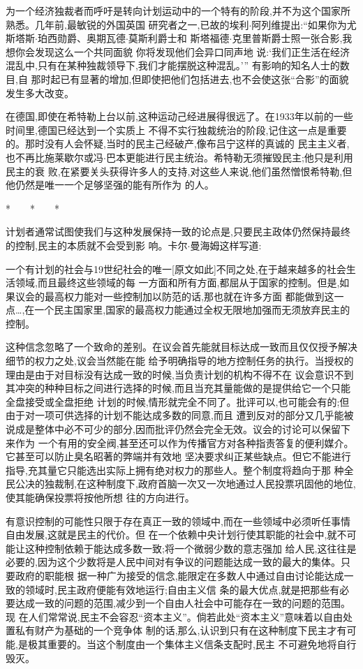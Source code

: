 ﻿\documentclass[12pt]{article}
\begin{document}
为一个经济独裁者而呼吁是转向计划运动中的一个特有的阶段,并不为这个国家所熟悉。几年前,最敏锐的外国英国
研究者之一,已故的埃利$\cdot$阿列维提出:``如果你为尤斯塔斯$\cdot$珀西勋爵、奥期瓦德$\cdot$莫斯利爵士和
斯塔福德$\cdot$克里普斯爵士照一张合影,我想你会发现这么一个共同面貌 \myrule 你将发现他们会异口同声地
说:‘我们正生活在经济混乱中,只有在某种独裁领导下,我们才能摆脱这种混乱。’'' 有影响的知名人士的数目,自
那时起已有显著的增加,但即使把他们包括进去,也不会使这张``合影''的面貌发生多大改变。

在德国,即使在希特勒上台以前,这种运动己经进展得很远了。在1933年以前的一些时间里,德国已经达到一个实质上
不得不实行独裁统治的阶段,记住这一点是重要的。那时没有人会怀疑,当时的民主己经破产,像布吕宁这样的真诚的
民主主义者,也不再比施莱歇尔或冯$\cdot$巴本更能进行民主统治。希特勒无须摧毁民主;他只是利用民主的衰
败,在紧要关头获得许多人的支持,对这些人来说,他们虽然憎恨希特勒,但他仍然是唯一一个足够坚强的能有所作为
的人。

*　　*　　*

计划者通常试图使我们与这种发展保持一致的论点是,只要民主政体仍然保持最终的控制,民主的本质就不会受到影
响。卡尔$\cdot$曼海姆这样写道:

一个有计划的社会与19世纪社会的唯一[原文如此]不同之处,在于越来越多的社会生活领域,而且最终这些领域的每
一方面和所有方面,都屈从于国家的控制。但是,如果议会的最高权力能对一些控制加以防范的话,那也就在许多方面
都能做到这一点\ldots ,在一个民主国家里,国家的最高权力能通过全权无限地加强而无须放弃民主的控制。

这种信念忽略了一个致命的差别。在议会首先能就目标达成一致而且仅仅授予解决细节的权力之处,议会当然能在能
给予明确指导的地方控制任务的执行。当授权的理由是由于对目标没有达成一致的时候,当负责计划的机构不得不在
议会意识不到其冲突的种种目标之间进行选择的时候,而且当充其量能做的是提供给它一个只能全盘接受或全盘拒绝
计划的时候,情形就完全不同了。批评可以,也可能会有的;但由于对一项可供选择的计划不能达成多数的同意,而且
遭到反对的部分又几乎能被说成是整体中必不可少的部分,因而批评仍然会完全无效。议会的讨论可以保留下来作为
一个有用的安全阀,甚至还可以作为传播官方对各种指责答复的便利媒介。它甚至可以防止臭名昭著的弊端并有效地
坚决要求纠正某些缺点。但它不能进行指导,充其量它只能选出实际上拥有绝对权力的那些人。整个制度将趋向于那
种全民公决的独裁制,在这种制度下,政府首脑一次又一次地通过人民投票巩固他的地位,使其能确保投票将按他所想
往的方向进行。

有意识控制的可能性只限于存在真正一致的领域中,而在一些领域中必须听任事情自由发展,这就是民主的代价。但
在一个依赖中央计划行使其职能的社会中,就不可能让这种控制依赖于能达成多数一致;将一个微弱少数的意志强加
给人民,这往往是必要的,因为这个少数将是人民中间对有争议的问题能达成一致的最大的集体。只要政府的职能根
据一种广为接受的信念,能限定在多数人中通过自由讨论能达成一致的领域时,民主政府便能有效地运行;自由主义信
条的最大优点,就是把那些有必要达成一致的问题的范围,减少到一个自由人社会中可能存在一致的问题的范围。现
在人们常常说,民主不会容忍``资本主义''。倘若此处``资本主义''意味着以自由处置私有财产为基础的一个竞争体
制的话,那么,认识到只有在这种制度下民主才有可能,是极其重要的。当这个制度由一个集体主义信条支配时,民主
不可避免地将自行毁灭。
\end{document}

